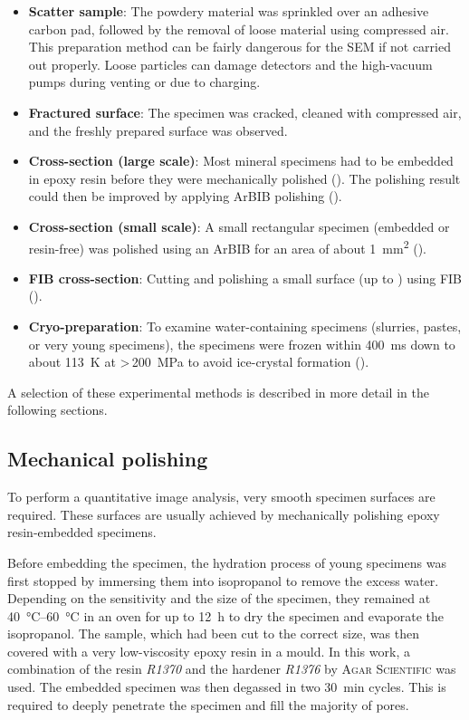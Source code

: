 \begin{itemize}
	\item \textbf{Scatter sample}: The powdery material was sprinkled over an adhesive carbon pad, followed by the removal of loose material using compressed air.
	This preparation method can be fairly dangerous for the \ac{SEM} if not carried out properly.
	Loose particles can damage detectors and the high-vacuum pumps during venting or due to charging.
	\item \textbf{Fractured surface}: The specimen was cracked, cleaned with compressed air, and the freshly prepared surface was observed.
	\item \textbf{Cross-section (large scale)}: Most mineral specimens had to be embedded in epoxy resin before they were mechanically polished (). The polishing result could then be improved by applying \ac{ArBIB} polishing ().
	\item \textbf{Cross-section (small scale)}: A small rectangular specimen (embedded or resin-free) was polished using an \ac{ArBIB} for an area of about \qty{1}{\square\milli\meter} ().
	\item \textbf{\Ac{FIB} cross-section}: Cutting and polishing a small surface (up to ) using \ac{FIB} ().
	\item \textbf{Cryo-preparation}: To examine water-containing specimens (slurries, pastes, or very young specimens), the specimens were frozen within \qty{400}{\milli\second} down to about \qty{113}{\kelvin} at >\,\qty{200}{\mega\pascal} to avoid ice-crystal formation ().
\end{itemize}

A selection of these experimental methods is described in more detail in the following sections.

\subsection{Mechanical polishing}
\label{sec:mech_pol}

To perform a quantitative image analysis, very smooth specimen surfaces are required.
These surfaces are usually achieved by mechanically polishing epoxy resin-embedded specimens.

Before embedding the specimen, the hydration process of young specimens was first stopped by immersing them into isopropanol to remove the excess water.
Depending on the sensitivity and the size of the specimen, they remained at \qtyrange{40}{60}{\celsius} in an oven for up to \qty{12}{\hour} to dry the specimen and evaporate the isopropanol.
The sample, which had been cut to the correct size, was then covered with a very low-viscosity epoxy resin in a mould.
In this work, a combination of the resin \textit{R1370} and the hardener \textit{R1376} by \textsc{Agar Scientific} was used.
The embedded specimen was then degassed in two \qty{30}{\minute} cycles.
This is required to deeply penetrate the specimen and fill the majority of pores.

